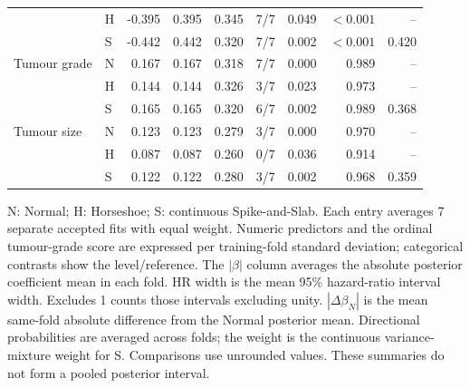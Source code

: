 \begin{longtable}{@{}>{\raggedright\arraybackslash}p{}lrrrrrrr@{}}
 & H & -0.395 & 0.395 & 0.345 & 7/7 & 0.049 & $<0.001$ & --\\*
 & S & -0.442 & 0.442 & 0.320 & 7/7 & 0.002 & $<0.001$ & 0.420\\[2pt]
Tumour grade & N & 0.167 & 0.167 & 0.318 & 7/7 & 0.000 & 0.989 & --\\*
 & H & 0.144 & 0.144 & 0.326 & 3/7 & 0.023 & 0.973 & --\\*
 & S & 0.165 & 0.165 & 0.320 & 6/7 & 0.002 & 0.989 & 0.368\\[2pt]
Tumour size & N & 0.123 & 0.123 & 0.279 & 3/7 & 0.000 & 0.970 & --\\*
 & H & 0.087 & 0.087 & 0.260 & 0/7 & 0.036 & 0.914 & --\\*
 & S & 0.122 & 0.122 & 0.280 & 3/7 & 0.002 & 0.968 & 0.359\\[2pt]
\end{longtable}
\noindent\begin{minipage}{\textwidth}
N: Normal; H: Horseshoe; S: continuous Spike-and-Slab. Each entry averages 7 separate accepted fits with equal weight. Numeric predictors and the ordinal tumour-grade score are expressed per training-fold standard deviation; categorical contrasts show the level/reference. The $|\beta|$ column averages the absolute posterior coefficient mean in each fold. HR width is the mean 95\% hazard-ratio interval width. Excludes 1 counts those intervals excluding unity. $|\Delta\beta_N|$ is the mean same-fold absolute difference from the Normal posterior mean. Directional probabilities are averaged across folds; the weight is the continuous variance-mixture weight for S. Comparisons use unrounded values. These summaries do not form a pooled posterior interval.
\end{minipage}\endgroup
